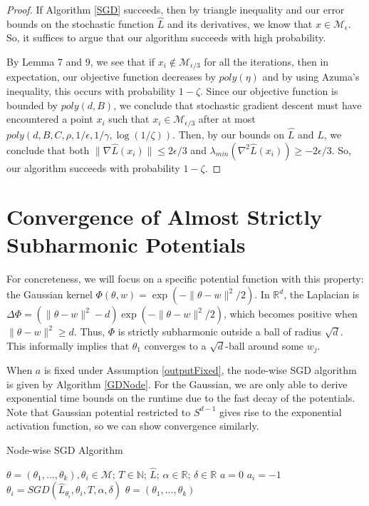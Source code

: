 \documentclass{article}
\newcommand{\N}{{\mathbb{N}}}
\newcommand{\R}{{\mathbb{R}}}
\begin{document}
\begin{proof}
If Algorithm \ref{SGD} succeeds, then by triangle inequality and our error bounds on the stochastic function $\widehat{L}$ and its derivatives, we know that $x \in \mathcal{M}_\epsilon$. So, it suffices to argue that our algorithm succeeds with high probability.

By \cite{GeHJY15} Lemma 7 and 9, we see that if
$x_i \not \in\mathcal{M}_{\epsilon/3}$ for all the iterations, then in
expectation, our objective function decreases by $poly(\eta)$ and by
using Azuma's inequality, this occurs with probability
$1-\zeta$. Since our objective function is bounded by $poly(d,B)$, we
conclude that stochastic gradient descent must have encountered a
point $x_i$ such that $x_i \in \mathcal{M}_{\epsilon/3}$ after at most
$poly(d,B,C,\rho,1/\epsilon,1/\gamma, \log(1/\zeta))$. Then, by our
bounds on $\widehat{L}$ and $L$, we conclude that both
$\|\nabla\widehat{L}(x_i)\| \leq 2\epsilon/3$ and
$\lambda_{min}(\nabla^2 \widehat{L}(x_i)) \geq -2\epsilon/3$. So, our
algorithm succeeds with probability $1-\zeta$.
\end{proof}



\section{Convergence of Almost Strictly Subharmonic Potentials}\label{App:Subharm}

For concreteness, we will focus on a specific potential function with this property: the Gaussian kernel $\Phi(\theta, w) = \exp(-\|\theta - w\|^2/2)$. In $\R^d$, the Laplacian is $\Delta \Phi = ( \|\theta - w\|^2 -d ) \exp(-\|\theta - w\|^2/2)$, which becomes positive when $\|\theta - w \|^2 \geq d$. Thus, $\Phi$ is strictly subharmonic outside a ball of radius $\sqrt{d}$. This informally implies that $\theta_1$ converges to a $\sqrt{d}$-ball around some $w_j$. 

When $a$ is fixed under Assumption \ref{outputFixed}, the node-wise
SGD algorithm is given by Algorithm \ref{GDNode}. For the Gaussian, we
are only able to derive exponential time bounds on the runtime due to
the fast decay of the potentials. Note that Gaussian potential
restricted to $S^{d-1}$ gives rise to the exponential activation
function, so we can show convergence similarly.

\begin{algorithm}[hb]
 \caption{Node-wise SGD Algorithm}
   \label{GDNode}
\begin{algorithmic}
    $\theta = (\theta_1,...,\theta_k), \theta_i \in \mathcal{M}$; $T\in \N$; $\widehat{L}$; $\alpha\in \R$; $\delta \in \R$
   \vspace{0.1in}
    $a = 0$
   \STATE $a_i = -1$
   \STATE  $\theta_i =  SGD( \widehat{L}_{\theta_i},\theta_i,T, \alpha,\delta)$
   \ENDFOR
    $\theta = (\theta_1,...,\theta_k)$
\end{algorithmic}
\end{algorithm}
\end{document}
